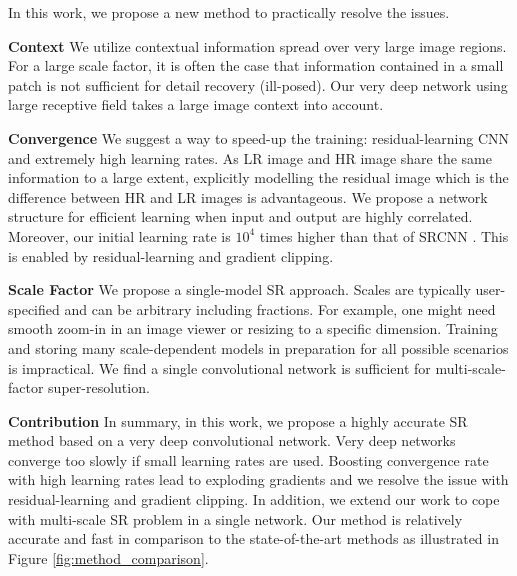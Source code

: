 \documentclass[10pt,twocolumn,letterpaper]{article}
\begin{document}
In this work, we propose a new method to practically resolve the issues.


\textbf{Context} We utilize contextual information spread over very large image regions. For a large scale factor, it is often the case that information contained in a small patch is not sufficient for detail recovery (ill-posed). Our very deep network using large receptive field takes a large image context into account.

\textbf{Convergence} We suggest a way to speed-up the training: residual-learning CNN and extremely high learning rates. As LR image and HR image share the same information to a large extent, explicitly modelling the residual image which is the difference between HR and LR images is advantageous. We propose a network structure for efficient learning when input and output are highly correlated. Moreover, our initial learning rate is $10^4$ times higher than that of SRCNN \cite{dong2015image}. This is enabled by residual-learning and gradient clipping.

\textbf{Scale Factor} We propose a single-model SR approach. Scales are typically user-specified and can be arbitrary including fractions. For example, one might need smooth zoom-in in an image viewer or resizing to a specific dimension. Training and storing many scale-dependent models in preparation for all possible scenarios is impractical. We find a single convolutional network is sufficient for multi-scale-factor super-resolution.

\textbf{Contribution} In summary, in this work, we propose a highly accurate SR method based on a very deep convolutional network. Very deep networks converge too slowly if small learning rates are used. Boosting convergence rate with high learning rates lead to exploding gradients and we resolve the issue with residual-learning and gradient clipping. In addition, we extend our work to cope with multi-scale SR problem in a single network. Our method is relatively accurate and fast in comparison to the state-of-the-art methods as illustrated in Figure \ref{fig:method_comparison}.
\end{document}
